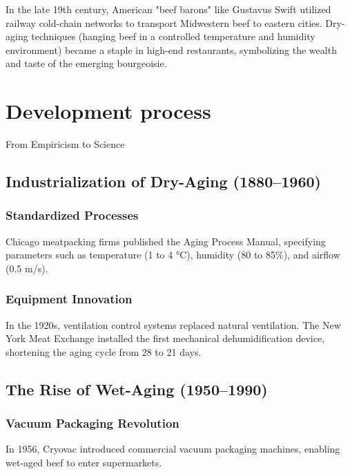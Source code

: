 \documentclass[lettersize,journal]{IEEEtran}
\begin{document}
\subsubsection{}

In the late 19th century, American "beef barons" like Gustavus Swift utilized railway cold-chain networks to transport Midwestern beef to eastern cities. Dry-aging techniques (hanging beef in a controlled temperature and humidity environment) became a staple in high-end restaurants, symbolizing the wealth and taste of the emerging bourgeoisie.

\section{Development process}

From Empiricism to Science

\subsection{Industrialization of Dry-Aging (1880–1960)}

\subsubsection{Standardized Processes}

Chicago meatpacking firms published the Aging Process Manual, specifying parameters such as temperature (1 to 4 °C), humidity (80 to 85\%), and airflow (0.5 m/s).

\subsubsection{Equipment Innovation}

In the 1920s, ventilation control systems replaced natural ventilation. The New York Meat Exchange installed the first mechanical dehumidification device, shortening the aging cycle from 28 to 21 days.

\subsection{The Rise of Wet-Aging (1950–1990)}

\subsubsection{Vacuum Packaging Revolution}

In 1956, Cryovac introduced commercial vacuum packaging machines, enabling wet-aged beef to enter supermarkets.
\end{document}
